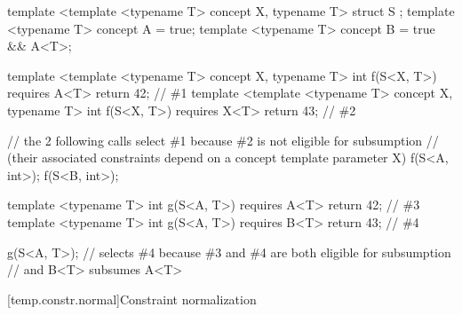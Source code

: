 \documentclass{wg21}
\begin{document}
\begin{addedblock}
\begin{example}
\begin{codeblock}
template <template <typename T> concept X, typename T>
struct S {};
template <typename T>
concept A = true;
template <typename T>
concept B = true && A<T>;

template <template <typename T>  concept X, typename T>
int f(S<X, T>) requires A<T> { return 42; } // \#1
template <template <typename T> concept X, typename T>
int f(S<X, T>) requires X<T> { return 43; } // \#2

// the 2 following calls select \#1 because \#2 is not eligible for subsumption
// (their associated constraints depend on a concept template parameter X)
f(S<A, int>{});
f(S<B, int>{});

template <typename T>
int g(S<A, T>) requires A<T> { return 42; } // \#3
template <typename T>
int g(S<A, T>) requires B<T> { return 43; } // \#4

g(S<A, T>{}); // selects \#4 because \#3 and \#4 are both eligible for subsumption
                       // and B<T> subsumes A<T>

\end{codeblock}
\end{example}
\end{addedblock}




[temp.constr.normal]{Constraint normalization}
%
\end{document}
